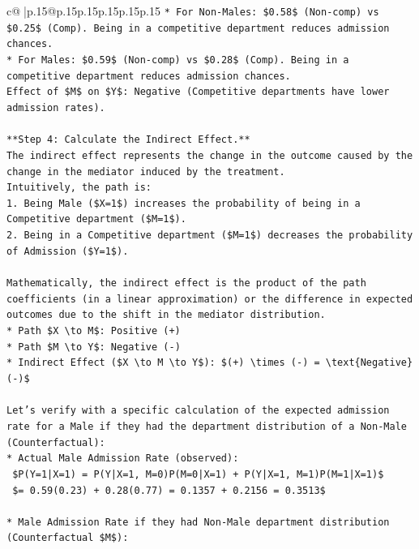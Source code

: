 \documentclass{article}
\begin{document}
{\begin{supertabular}{c@{$\;$}|p{.15\linewidth}@{}p{.15\linewidth}p{.15\linewidth}p{.15\linewidth}p{.15\linewidth}p{.15\linewidth}}
{{{\texttt{*   For Non{-}Males: \$0.58\$ (Non{-}comp) vs \$0.25\$ (Comp). Being in a competitive department reduces admission chances.} \\
\texttt{*   For Males: \$0.59\$ (Non{-}comp) vs \$0.28\$ (Comp). Being in a competitive department reduces admission chances.} \\
\texttt{Effect of \$M\$ on \$Y\$: Negative (Competitive departments have lower admission rates).} \\
\\ 
\texttt{**Step 4: Calculate the Indirect Effect.**} \\
\texttt{The indirect effect represents the change in the outcome caused by the change in the mediator induced by the treatment.} \\
\texttt{Intuitively, the path is:} \\
\texttt{1.  Being Male (\$X=1\$) increases the probability of being in a Competitive department (\$M=1\$).} \\
\texttt{2.  Being in a Competitive department (\$M=1\$) decreases the probability of Admission (\$Y=1\$).} \\
\\ 
\texttt{Mathematically, the indirect effect is the product of the path coefficients (in a linear approximation) or the difference in expected outcomes due to the shift in the mediator distribution.} \\
\texttt{*   Path \$X \textbackslash{}to M\$: Positive (+)} \\
\texttt{*   Path \$M \textbackslash{}to Y\$: Negative ({-})} \\
\texttt{*   Indirect Effect (\$X \textbackslash{}to M \textbackslash{}to Y\$): \$(+) \textbackslash{}times ({-}) = \textbackslash{}text\{Negative\} ({-})\$} \\
\\ 
\texttt{Let's verify with a specific calculation of the expected admission rate for a Male if they had the department distribution of a Non{-}Male (Counterfactual):} \\
\texttt{*   Actual Male Admission Rate (observed):} \\
\texttt{    \$P(Y=1|X=1) = P(Y|X=1, M=0)P(M=0|X=1) + P(Y|X=1, M=1)P(M=1|X=1)\$} \\
\texttt{    \$= 0.59(0.23) + 0.28(0.77) = 0.1357 + 0.2156 = 0.3513\$} \\
\\ 
\texttt{*   Male Admission Rate if they had Non{-}Male department distribution (Counterfactual \$M\$):} \\
}}}
\end{supertabular}}
\end{document}
